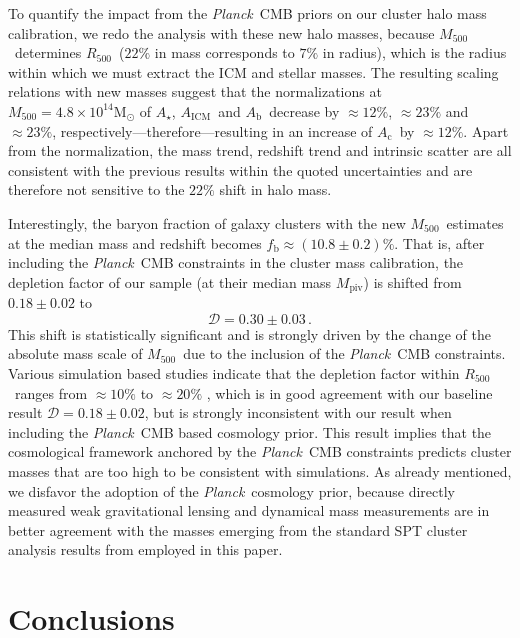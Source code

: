 \documentclass[useAMS,usenatbib,iop,numberedappendix]{mn2e}
\newcommand{\Msun}{\ensuremath{\mathrm{M}_{\odot}}}
\newcommand{\Rfiveoo}{\ensuremath{R_{500}}}
\newcommand{\Mfiveoo}{\ensuremath{M_{500}}}
\newcommand{\PLANCK}{\emph{Planck}}
\newcommand{\MPIV}{\ensuremath{M_{\mathrm{piv}}}}
\newcommand{\Agas}{\ensuremath{A_{\mathrm{ICM}}}}
\newcommand{\Abary}{\ensuremath{A_{\mathrm{b}}}}
\newcommand{\Acold}{\ensuremath{A_{\mathrm{c}}}}
\newcommand{\Astar}{\ensuremath{A_{\star}}}
\newcommand{\fbary}{\ensuremath{f_{\mathrm{b}}}}
\newcommand{\percent}{\ensuremath{\%}}
\begin{document}
To quantify the impact from the \PLANCK\ CMB priors on our cluster halo mass calibration, we redo the analysis with these new halo masses, because \Mfiveoo\ determines \Rfiveoo\ ($22\percent$ in mass corresponds to $7\percent$ in radius), which is the radius within which we must extract the ICM and stellar masses.   The resulting scaling relations with new masses suggest that the normalizations at $\Mfiveoo=4.8\times10^{14}\Msun$ of \Astar, \Agas\ and \Abary\ decrease by $\approx12\percent$, $\approx23\percent$ and $\approx23\percent$, respectively---therefore---resulting in an increase of \Acold\ by $\approx12\percent$.  Apart from the normalization, the mass trend, redshift trend and intrinsic scatter are all consistent with the previous results within the quoted uncertainties and are therefore not sensitive to the $22\percent$ shift in halo mass.

Interestingly, the baryon fraction of galaxy clusters with the new \Mfiveoo\ estimates at the median mass and redshift becomes $\fbary\approx\left(10.8\pm0.2\right)\percent$.  That is, after including the \PLANCK\ CMB constraints in the cluster mass calibration, the depletion factor of our sample (at their median mass \MPIV) is shifted  from $0.18\pm0.02$ to
\[
\mathcal{D} = 0.30\pm0.03 \, .
\]
This shift is statistically significant and is strongly driven by the change of the absolute mass scale of \Mfiveoo\ due to the inclusion of the \PLANCK\ CMB constraints.  Various simulation based studies indicate that the depletion factor within \Rfiveoo\ ranges from $\approx10\percent$ to $\approx20\percent$ \citep[e.g.,][]{mccarthy11,planelles12,barnes17}, which is in good agreement with our baseline result $\mathcal{D} = 0.18\pm0.02$, but is strongly inconsistent with our result when including the \PLANCK\ CMB based cosmology prior. This result implies that the cosmological framework anchored by the \PLANCK\ CMB constraints predicts cluster masses that are too high to be consistent with simulations.  As already mentioned, we disfavor the adoption of the \PLANCK\ cosmology prior, because directly measured weak gravitational lensing \citep{gruen14,dehaan16,dietrich17,stern18} and dynamical mass measurements \citep{bocquet15,capasso17} are in better agreement with the masses emerging from the standard SPT cluster analysis results from \citet{dehaan16} employed in this paper.


%
%

\section{Conclusions}
\label{sec:xvp_conclusion}
\end{document}
